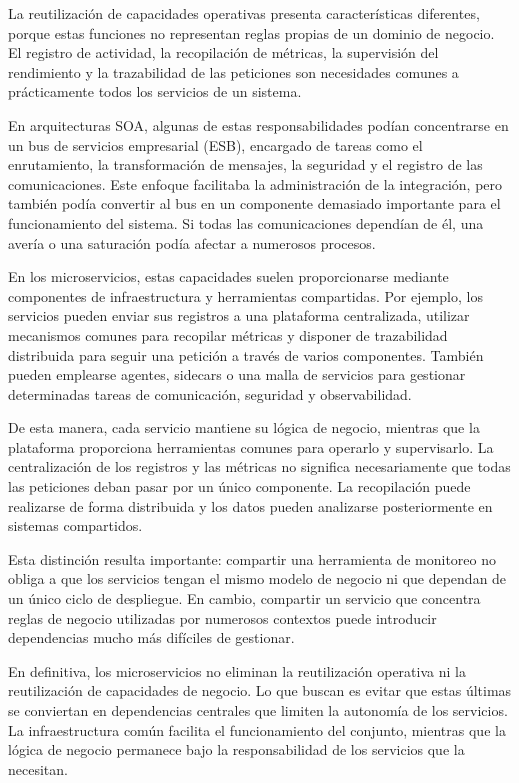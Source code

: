 La reutilización de capacidades operativas presenta características diferentes, porque estas funciones no representan reglas propias de un dominio de negocio. El registro de actividad, la recopilación de métricas, la supervisión del rendimiento y la trazabilidad de las peticiones son necesidades comunes a prácticamente todos los servicios de un sistema.

En arquitecturas SOA, algunas de estas responsabilidades podían concentrarse en un bus de servicios empresarial (ESB), encargado de tareas como el enrutamiento, la transformación de mensajes, la seguridad y el registro de las comunicaciones. Este enfoque facilitaba la administración de la integración, pero también podía convertir al bus en un componente demasiado importante para el funcionamiento del sistema. Si todas las comunicaciones dependían de él, una avería o una saturación podía afectar a numerosos procesos.

En los microservicios, estas capacidades suelen proporcionarse mediante componentes de infraestructura y herramientas compartidas. Por ejemplo, los servicios pueden enviar sus registros a una plataforma centralizada, utilizar mecanismos comunes para recopilar métricas y disponer de trazabilidad distribuida para seguir una petición a través de varios componentes. También pueden emplearse agentes, sidecars o una malla de servicios para gestionar determinadas tareas de comunicación, seguridad y observabilidad.

De esta manera, cada servicio mantiene su lógica de negocio, mientras que la plataforma proporciona herramientas comunes para operarlo y supervisarlo. La centralización de los registros y las métricas no significa necesariamente que todas las peticiones deban pasar por un único componente. La recopilación puede realizarse de forma distribuida y los datos pueden analizarse posteriormente en sistemas compartidos.

Esta distinción resulta importante: compartir una herramienta de monitoreo no obliga a que los servicios tengan el mismo modelo de negocio ni que dependan de un único ciclo de despliegue. En cambio, compartir un servicio que concentra reglas de negocio utilizadas por numerosos contextos puede introducir dependencias mucho más difíciles de gestionar.

En definitiva, los microservicios no eliminan la reutilización operativa ni la reutilización de capacidades de negocio. Lo que buscan es evitar que estas últimas se conviertan en dependencias centrales que limiten la autonomía de los servicios. La infraestructura común facilita el funcionamiento del conjunto, mientras que la lógica de negocio permanece bajo la responsabilidad de los servicios que la necesitan.

